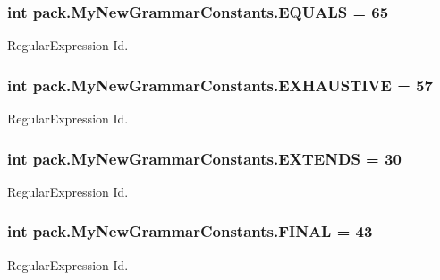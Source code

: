 \subsubsection[{\texorpdfstring{E\+Q\+U\+A\+LS}{EQUALS}}]{\setlength{\rightskip}{0pt plus 5cm}int pack.\+My\+New\+Grammar\+Constants.\+E\+Q\+U\+A\+LS = 65}\hypertarget{interfacepack_1_1_my_new_grammar_constants_a96ced15bd9875664fbf580109f9fb295}{}\label{interfacepack_1_1_my_new_grammar_constants_a96ced15bd9875664fbf580109f9fb295}
Regular\+Expression Id. 
\subsubsection[{\texorpdfstring{E\+X\+H\+A\+U\+S\+T\+I\+VE}{EXHAUSTIVE}}]{\setlength{\rightskip}{0pt plus 5cm}int pack.\+My\+New\+Grammar\+Constants.\+E\+X\+H\+A\+U\+S\+T\+I\+VE = 57}\hypertarget{interfacepack_1_1_my_new_grammar_constants_aeb4b6ca6d9e896275c36eb3ff2fb954d}{}\label{interfacepack_1_1_my_new_grammar_constants_aeb4b6ca6d9e896275c36eb3ff2fb954d}
Regular\+Expression Id. 
\subsubsection[{\texorpdfstring{E\+X\+T\+E\+N\+DS}{EXTENDS}}]{\setlength{\rightskip}{0pt plus 5cm}int pack.\+My\+New\+Grammar\+Constants.\+E\+X\+T\+E\+N\+DS = 30}\hypertarget{interfacepack_1_1_my_new_grammar_constants_a27d9dacf97ff199b59f9c13776d3dac9}{}\label{interfacepack_1_1_my_new_grammar_constants_a27d9dacf97ff199b59f9c13776d3dac9}
Regular\+Expression Id. 
\subsubsection[{\texorpdfstring{F\+I\+N\+AL}{FINAL}}]{\setlength{\rightskip}{0pt plus 5cm}int pack.\+My\+New\+Grammar\+Constants.\+F\+I\+N\+AL = 43}\hypertarget{interfacepack_1_1_my_new_grammar_constants_aed2899306b38ba02056a1e2d12b758d0}{}\label{interfacepack_1_1_my_new_grammar_constants_aed2899306b38ba02056a1e2d12b758d0}
Regular\+Expression Id. 
